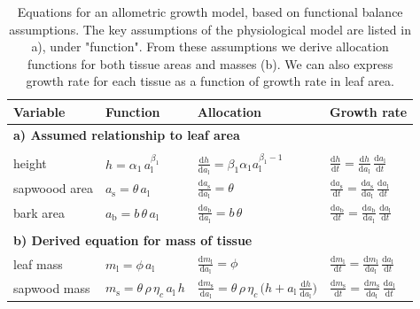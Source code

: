 \documentclass[10pt,twoside]{article}
\begin{document}
\newpage

\begin{table}[h!]
\caption{Equations for an allometric growth model, based on functional balance assumptions. 
The key assumptions of the physiological model are listed in a), under "function". From these
assumptions we derive allocation functions for both tissue areas and masses (b). We can also 
express growth rate for each tissue as a function of growth rate in leaf area. }
\centering
  \begin{tabular}{p{2.5cm}p{3.5cm}p{5cm}p{4cm} }\\ \hline
  Variable & Function & Allocation & Growth rate\\ \hline
  \multicolumn{4}{l}{\textbf{a) Assumed relationship to leaf area}} \\ \\
  height &
    $h = \alpha_1 \, a_\textrm{l}^{\beta_1}$ &
    $\frac{\textrm{d}h}{\textrm{d}a_\textrm{l}} =  \beta_1 \alpha_1 a_\textrm{l}^{\beta_1-1}$ &
    $\frac{\textrm{d}h}{\textrm{d}t}  = \frac{\textrm{d}h}{\textrm{d}a_\textrm{l}} \, \frac{\textrm{d}a_\textrm{l}}{\textrm{d}t}$ \\
  sapwoood area &
    $a_\textrm{s} = \theta \, a_\textrm{l}$ &
    $\frac{\textrm{d}a_\textrm{s}}{\textrm{d} a_\textrm{l}} = \theta$ &
    $\frac{\textrm{d}a_\textrm{s}}{\textrm{d}t}  =\frac{\textrm{d}a_\textrm{s}}{\textrm{d} a_\textrm{l}} \, \frac{\textrm{d}a_\textrm{l}}{\textrm{d}t}$ \\
  bark area &
    $a_\textrm{b} = b \, \theta \, a_\textrm{l}$ &
    $\frac{\textrm{d}a_\textrm{b}}{\textrm{d} a_\textrm{l}} = b \, \theta$ &
    $\frac{\textrm{d}a_\textrm{b}}{\textrm{d}t} = \frac{\textrm{d}a_\textrm{b}}{\textrm{d} a_\textrm{l}} \, \frac{\textrm{d}a_\textrm{l}}{\textrm{d}t}$ \\  \\
  \multicolumn{4}{l}{\textbf{b) Derived equation for mass of tissue }} \\
  leaf mass &
    $m_\textrm{l} = \phi \, a_\textrm{l} $ &
    $\frac{\textrm{d}m_\textrm{l}}{\textrm{d}a_\textrm{l}} = \phi$ &
    $\frac{\textrm{d}m_\textrm{l}}{\textrm{d}t}  = \frac{\textrm{d}m_\textrm{l}}{\textrm{d}a_\textrm{l}}  \, \frac{\textrm{d}a_\textrm{l}}{\textrm{d}t}$ \\
  sapwood mass &
    $m_\textrm{s} = \theta \, \rho \, \eta_c \, a_\textrm{l} \, h $ &
    $\frac{\textrm{d}m_\textrm{s}}{\textrm{d}a_\textrm{l}} = \theta\, \rho\, \eta_c\, \big( h + a_\textrm{l}\, \frac{\textrm{d}h}{\textrm{d}a_\textrm{l}} \big)$ &
    $\frac{\textrm{d}m_\textrm{s}}{\textrm{d}t}  = \frac{\textrm{d}m_\textrm{s}}{\textrm{d}a_\textrm{l}} \, \frac{\textrm{d}a_\textrm{l}}{\textrm{d}t}$ \\

\end{tabular}
\end{table}
\end{document}
